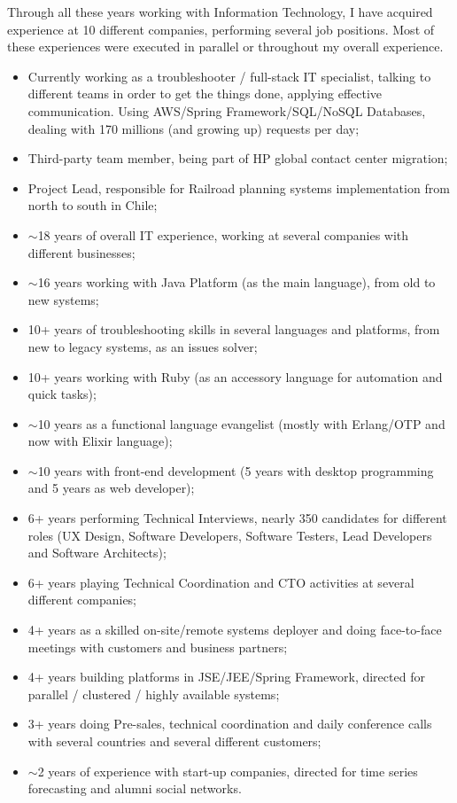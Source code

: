 
\begin{cvparagraph}

Through all these years working with Information Technology, I have acquired experience at 10 different companies, performing several job positions. Most of these experiences were executed in parallel or throughout my overall experience.

\begin{itemize}
\item Currently working as a troubleshooter / full-stack IT specialist, talking to different teams in order to get the things done, applying effective communication. Using AWS/Spring Framework/SQL/NoSQL Databases, dealing with 170 millions (and growing up) requests per day;
\item Third-party team member, being part of HP global contact center migration;
\item Project Lead, responsible for Railroad planning systems implementation from north to south in Chile;
\item $\sim$18 years of overall IT experience, working at several companies with different businesses;
\item $\sim$16 years working with Java Platform (as the main language), from old to new systems;
\item 10+ years of troubleshooting skills in several languages and platforms, from new to legacy systems, as an issues solver;
\item 10+ years working with Ruby  (as an accessory language for automation and quick tasks);
\item $\sim$10 years as a functional language evangelist (mostly with Erlang/OTP and now with Elixir language);
\item $\sim$10 years with front-end development (5 years with desktop programming and 5 years as web developer);
\item 6+ years performing Technical Interviews, nearly 350 candidates for different roles (UX Design, Software Developers, Software Testers, Lead Developers and Software Architects);
\item 6+ years playing Technical Coordination and CTO activities at several different companies;
\item 4+ years as a skilled on-site/remote systems deployer and doing face-to-face meetings with customers and business partners;
\item 4+ years building platforms in JSE/JEE/Spring Framework, directed for parallel / clustered / highly available systems;
\item 3+ years doing Pre-sales, technical coordination and daily conference calls with several countries and several different customers;
\item $\sim$2 years of experience with start-up companies, directed for time series forecasting and alumni social networks.
\end{itemize}
\end{cvparagraph}
